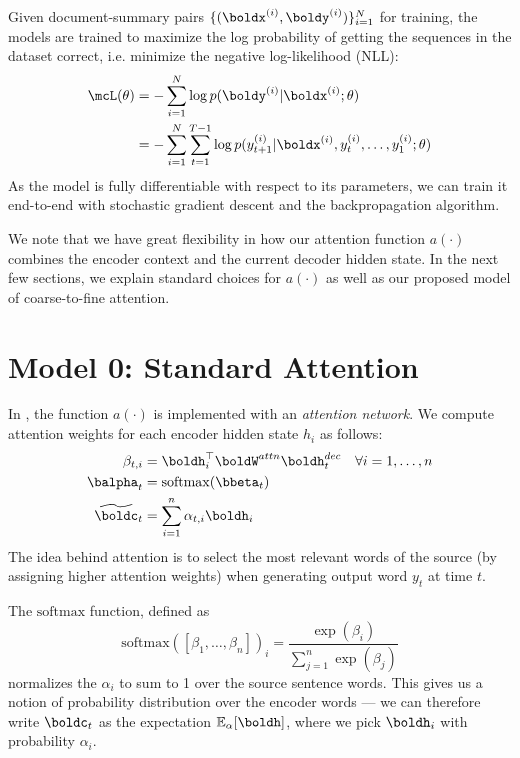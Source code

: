 \documentclass[12pt]{report}
\begin{document}
Given document-summary pairs $\{ (\boldx^{(i)}, \boldy^{(i)}) \}_{i=1}^N$ for training, the models are trained to maximize the log probability of getting the sequences in the dataset correct, i.e. minimize the negative log-likelihood (NLL):
\begin{align*}
\mcL(\theta) &= - \sum_{i=1}^N \log p(\boldy^{(i)} | \boldx^{(i)}; \theta)  \\
&= -\sum_{i=1}^N \sum_{t=1}^{T-1} \log p(y_{t+1}^{(i)} | \boldx^{(i)}, y_t^{(i)}, \ldots, y_1^{(i)} ; \theta)
\end{align*}
As the model is fully differentiable with respect to its parameters, we can train it end-to-end with stochastic gradient descent and the backpropagation algorithm.

We note that we have great flexibility in how our attention function $a(\cdot)$ combines the encoder context and the current decoder hidden state. In the next few sections, we explain standard choices for $a(\cdot)$ as well as our proposed model of coarse-to-fine attention.

\section{Model 0: Standard Attention}

In \citet{bahdanau2014neural}, the function $a(\cdot)$ is implemented with an \emph{attention network}. We compute attention weights for each encoder hidden state $h_i$ as follows:
\begin{align}
\beta_{t,i} &= \boldh_i^\top \boldW^{attn} \boldh_t^{dec} \quad \forall i = 1, \ldots, n\\
\balpha_t &= \mathrm{softmax}(\bbeta_t) \\
\widetilde{\boldc}_t &= \sum_{i=1}^n \alpha_{t,i} \boldh_i
\end{align}
The idea behind attention is to select the most relevant words of the source (by assigning higher attention weights) when generating output word $y_t$ at time $t$.

The $\mathrm{softmax}$ function, defined as
\begin{equation}
\mathrm{softmax}([\beta_1, \ldots, \beta_n])_i =  \frac{\exp(\beta_i)}{\sum_{j=1}^n \exp(\beta_j)}
\end{equation}
normalizes the $\alpha_i$ to sum to 1 over the source sentence words. This gives us a notion of probability distribution over the encoder words --- we can therefore write $\boldc_t$ as the expectation $\mathbb{E}_\alpha[\boldh]$, where we pick $\boldh_i$ with probability $\alpha_i$.
\end{document}
